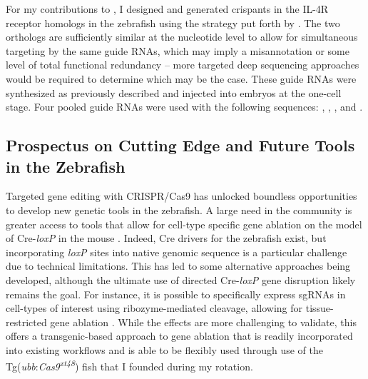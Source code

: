 For my contributions to \citet{Cronan2021}, I designed and generated crispants in the IL-4R receptor homologs in the zebrafish using the strategy put forth by \citet{Wu2018}. The two orthologs are sufficiently similar at the nucleotide level to allow for simultaneous targeting by the same guide RNAs, which may imply a misannotation or some level of total functional redundancy -- more targeted deep sequencing approaches would be required to determine which may be the case. These guide RNAs were synthesized as previously described and injected into embryos at the one\hyp{}cell stage. Four pooled guide RNAs were used with the following sequences: , , , and .

\subsection{Prospectus on Cutting Edge and Future Tools in the Zebrafish}\label{newtech}

Targeted gene editing with CRISPR/Cas9 has unlocked boundless opportunities to develop new genetic tools in the zebrafish. A large need in the community is greater access to tools that allow for cell\hyp{}type specific gene ablation on the model of Cre\hyp{}\textit{loxP} in the mouse \citep{Housden2017}. Indeed, Cre drivers for the zebrafish exist, but incorporating \textit{loxP} sites into native genomic sequence is a particular challenge due to technical limitations. This has led to some alternative approaches being developed, although the ultimate use of directed Cre\hyp{}\textit{loxP} gene disruption likely remains the goal. For instance, it is possible to specifically express sgRNAs in cell\hyp{}types of interest using ribozyme\hyp{}mediated cleavage, allowing for tissue\hyp{}restricted gene ablation \citep{Wang2021, Yin2015}. While the effects are more challenging to validate, this offers a transgenic\hyp{}based approach to gene ablation that is readily incorporated into existing workflows and is able to be flexibly used through use of the Tg(\textit{ubb}:\textit{Cas9\textsuperscript{xt48}}) fish that I founded during my rotation. 

